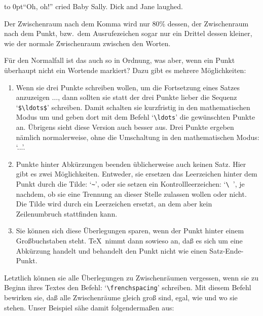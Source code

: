 {\hfuzz 1000pt
\hbox to 0pt{``Oh, oh!'' cried Baby Sally. Dick and Jane laughed.}}
\medskip

Der Zwischenraum nach dem 
Komma wird nur 80\% dessen, der Zwischenraum
nach dem 
Punkt, bzw.\ dem Ausrufezeichen sogar nur ein Drittel dessen
kleiner, wie der normale Zwischenraum zwischen den Worten.

F\"ur den Normalfall ist das auch so in Ordnung, was aber, wenn ein
Punkt \"uberhaupt nicht ein Wortende markiert? Dazu gibt es mehrere
M\"oglichkeiten:
\begin{enumerate}
\item Wenn sie drei 
Punkte schreiben wollen, um die Fortsetzung eines
Satzes anzuzeigen $\ldots$, dann sollten sie statt der drei Punkte
lieber die Sequenz 
`\verb|$\ldots$|' schreiben. Damit schalten sie
kurzfristig in den mathematischen 
Modus um und geben dort mit dem
Befehl `\verb|\ldots|' die gew\"unschten Punkte an. \"Ubrigens sieht diese
Version auch besser aus. Drei Punkte ergeben n\"amlich normalerweise, ohne
die Umschaltung in den mathematischen Modus: `...'.
\item {}Punkte hinter 
Abk\"urzungen beenden \"ublicherweise auch keinen
Satz. Hier gibt es zwei M\"oglichkeiten. Entweder, sie ersetzen das
Leerzeichen hinter dem 
Punkt durch die Tilde: `\verb|~|', oder sie
setzen ein Kontrollleerzeichen: `\verb*+\ +', je nachdem, ob sie eine
Trennung an dieser Stelle zulassen wollen oder nicht. Die Tilde wird
durch ein Leerzeichen ersetzt, an dem aber kein Zeilenumbruch
stattfinden kann.
\item Sie k\"onnen sich diese \"Uberlegungen sparen, wenn der
Punkt hinter
einem 
Gro\ss{}buchstaben steht. \TeX\ nimmt dann sowieso an, da\ss{} es sich
um eine 
Abk\"urzung handelt und behandelt den Punkt nicht wie einen
Satz-Ende-Punkt.
\end{enumerate}
Letztlich k\"onnen sie alle \"Uberlegungen zu 
Zwischenr\"aumen vergessen,
wenn sie zu Beginn ihres Textes den Befehl:
`\verb|\frenchspacing|'
schreiben. Mit diesem Befehl bewirken sie, da\ss{} alle Zwischenr\"aume
gleich gro\ss{} sind, egal, wie und wo sie stehen. Unser Beispiel s\"ahe
damit folgenderma\ss{}en aus:\medskip

